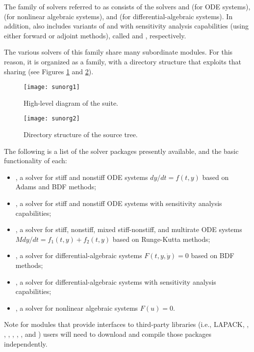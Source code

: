 %
The family of solvers referred to as {\sundials} consists of the solvers
{\cvode} and {\arkode} (for ODE systems), {\kinsol} (for nonlinear algebraic
systems), and {\ida} (for differential-algebraic systems).  In addition,
{\sundials} also includes variants of {\cvode} and {\ida} with sensitivity analysis
capabilities (using either forward or adjoint methods), called {\cvodes} and
{\idas}, respectively.

The various solvers of this family share many subordinate modules.
For this reason, it is organized as a family, with a directory
structure that exploits that sharing (see Figures \ref{f:sunorg1} and
\ref{f:sunorg2}).
\begin{figure}[htb]
{\centerline{\texttt{[image: sunorg1]}}}
\caption {High-level diagram of the {\sundials} suite.}\label{f:sunorg1}
\end{figure}
\begin{figure}[htb]
{\centerline{\texttt{[image: sunorg2]}}}
\caption {Directory structure of the {\sundials} source tree.}\label{f:sunorg2}
\end{figure}
The following is a list of the solver packages presently available, and
the basic functionality of each:
\begin{itemize}

\item {\cvode},
  a solver for stiff and nonstiff ODE systems $dy/dt = f(t,y)$ based
  on Adams and BDF methods;

\item {\cvodes},
  a solver for stiff and nonstiff ODE systems with sensitivity analysis capabilities;

\item {\arkode},
  a solver for stiff, nonstiff, mixed stiff-nonstiff, and multirate ODE systems
  $M dy/dt = f_1(t,y) + f_2(t,y)$ based on Runge-Kutta methods;

\item {\ida},
  a solver for differential-algebraic systems $F(t,y,\dot{y}) = 0$ based on BDF methods;

\item {\idas},
  a solver for differential-algebraic systems
  with sensitivity analysis capabilities;

\item {\kinsol},
  a solver for nonlinear algebraic systems $F(u) = 0$.

\end{itemize}
Note for modules that provide interfaces to third-party libraries (i.e., LAPACK,
{\klu}, {\superlumt}, {\superludist}, {\hypre}, {\petsc}, {\trilinos}, and
{\raja}) users will need to download and compile those packages independently.
